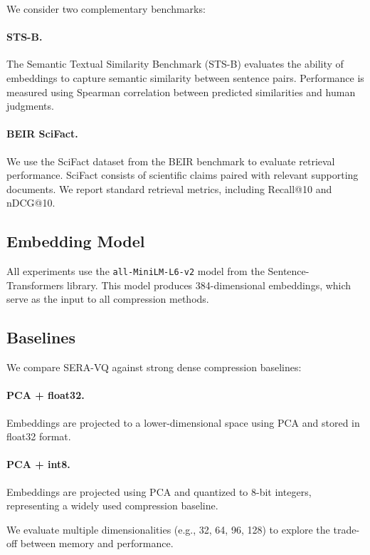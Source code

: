 \documentclass{article}
\begin{document}
We consider two complementary benchmarks:

\paragraph{STS-B.}
The Semantic Textual Similarity Benchmark (STS-B) evaluates the ability of embeddings to capture semantic similarity between sentence pairs. Performance is measured using Spearman correlation between predicted similarities and human judgments.

\paragraph{BEIR SciFact.}
We use the SciFact dataset from the BEIR benchmark to evaluate retrieval performance. SciFact consists of scientific claims paired with relevant supporting documents. We report standard retrieval metrics, including Recall@10 and nDCG@10.

\subsection{Embedding Model}

All experiments use the \texttt{all-MiniLM-L6-v2} model from the Sentence-Transformers library. This model produces 384-dimensional embeddings, which serve as the input to all compression methods.

\subsection{Baselines}

We compare SERA-VQ against strong dense compression baselines:

\paragraph{PCA + float32.}
Embeddings are projected to a lower-dimensional space using PCA and stored in float32 format.

\paragraph{PCA + int8.}
Embeddings are projected using PCA and quantized to 8-bit integers, representing a widely used compression baseline.

We evaluate multiple dimensionalities (e.g., 32, 64, 96, 128) to explore the trade-off between memory and performance.
\end{document}
